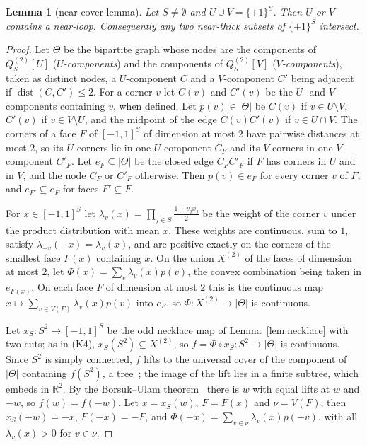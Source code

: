 \documentclass[11pt,letterpaper]{article}
\newtheorem{lemma}[theorem]{Lemma}
\theoremstyle{definition}
\newcommand{\R}{\mathbb{R}}
\newcommand{\cube}[1]{\{\pm1\}^{#1}}
\DeclareMathOperator{\dist}{dist}
\begin{document}
\begin{lemma}[near-cover lemma]\label{lem:nearcover}
Let $S\ne\emptyset$ and $U\cup V=\cube S$. Then $U$ or $V$ contains a near-loop. Consequently any two
near-thick subsets of $\cube S$ intersect.
\end{lemma}

\begin{proof}
Let $\Theta$ be the bipartite graph whose nodes are the components of $Q^{(2)}_S[U]$
(\emph{$U$-components}) and the components of $Q^{(2)}_S[V]$ (\emph{$V$-components}), taken as distinct
nodes, a $U$-component $C$ and a $V$-component $C'$ being adjacent if $\dist(C,C')\le2$. For a corner $v$
let $C(v)$ and $C'(v)$ be the $U$- and $V$-components containing $v$, when defined. Let $p(v)\in|\Theta|$
be $C(v)$ if $v\in U\setminus V$, $C'(v)$ if $v\in V\setminus U$, and the midpoint of the edge
$C(v)C'(v)$ if $v\in U\cap V$. The corners of a face $F$ of $[-1,1]^S$ of dimension at most $2$ have
pairwise distances at most $2$, so its $U$-corners lie in one $U$-component $C_F$ and its $V$-corners in
one $V$-component $C'_F$. Let $e_F\subseteq|\Theta|$ be the closed edge $C_FC'_F$ if $F$ has corners in $U$
and in $V$, and the node $C_F$ or $C'_F$ otherwise. Then $p(v)\in e_F$ for every corner $v$ of $F$, and
$e_{F'}\subseteq e_F$ for faces $F'\subseteq F$.

For $x\in[-1,1]^S$ let $\lambda_v(x)=\prod_{j\in S}\frac{1+v_jx_j}2$ be the weight of the corner $v$
under the product distribution with mean $x$. These weights are continuous, sum to $1$, satisfy
$\lambda_{-v}(-x)=\lambda_v(x)$, and are positive exactly on the corners of the smallest face $F(x)$
containing $x$. On the union $X^{(2)}$ of the faces of dimension at most $2$, let
$\Phi(x)=\sum_v\lambda_v(x)p(v)$, the convex combination being taken in $e_{F(x)}$. On each face $F$ of
dimension at most $2$ this is the continuous map $x\mapsto\sum_{v\in V(F)}\lambda_v(x)p(v)$ into $e_F$, so
$\Phi\colon X^{(2)}\to|\Theta|$ is continuous.

Let $x_S\colon S^2\to[-1,1]^S$ be the odd necklace map of Lemma~\ref{lem:necklace} with two cuts; as in
(K4), $x_S(S^2)\subseteq X^{(2)}$, so $f=\Phi\circ x_S\colon S^2\to|\Theta|$ is continuous. Since $S^2$ is
simply connected, $f$ lifts to the universal cover of the component of $|\Theta|$ containing $f(S^2)$, a
tree~\cite{Hat02}; the image of the lift lies in a finite subtree, which embeds in $\R^2$. By the
Borsuk--Ulam theorem~\cite{Mat03} there is $w$ with equal lifts at $w$ and $-w$, so $f(w)=f(-w)$. Let
$x=x_S(w)$, $F=F(x)$ and $\nu=V(F)$; then $x_S(-w)=-x$, $F(-x)=-F$, and
$\Phi(-x)=\sum_{v\in\nu}\lambda_v(x)p(-v)$, with all $\lambda_v(x)>0$ for $v\in\nu$.


\end{proof}
\end{document}
